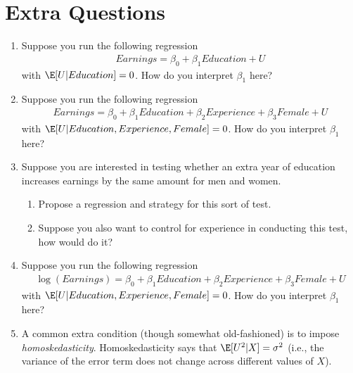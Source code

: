 \documentclass[
  letterpaper,
  DIV=11,
  numbers=noendperiod]{scrreprt}
\begin{document}
\section{Extra Questions}\label{extra-questions-2}

\begin{enumerate}
\def\labelenumi{\arabic{enumi}.}
\item
  Suppose you run the following regression \begin{align*}
    Earnings = \beta_0 + \beta_1 Education + U
  \end{align*} with \(\E[U|Education] = 0\). How do you interpret
  \(\beta_1\) here?
\item
  Suppose you run the following regression \begin{align*}
    Earnings = \beta_0 + \beta_1 Education + \beta_2 Experience + \beta_3 Female + U
  \end{align*} with \(\E[U|Education, Experience, Female] = 0\). How do
  you interpret \(\beta_1\) here?
\item
  Suppose you are interested in testing whether an extra year of
  education increases earnings by the same amount for men and women.

  \begin{enumerate}
  \def\labelenumii{\alph{enumii})}
  \item
    Propose a regression and strategy for this sort of test.
  \item
    Suppose you also want to control for experience in conducting this
    test, how would do it?
  \end{enumerate}
\item
  Suppose you run the following regression \begin{align*}
    \log(Earnings) = \beta_0 + \beta_1 Education + \beta_2 Experience + \beta_3 Female + U
  \end{align*} with \(\E[U|Education, Experience, Female] = 0\). How do
  you interpret \(\beta_1\) here?
\item
  A common extra condition (though somewhat old-fashioned) is to impose
  \emph{homoskedasticity}. Homoskedasticity says that
  \(\E[U^2|X] = \sigma^2\) (i.e., the variance of the error term does
  not change across different values of \(X\)).


\end{enumerate}
\end{document}

